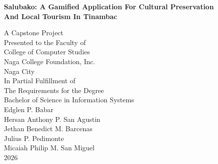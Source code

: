 \documentclass[11pt]{research}
\begin{document}
\thispagestyle{empty}
\begin{center}
  \vspace{0in}
  {\fontsize{14pt}{20pt}\selectfont \textbf{Salubako: A Gamified Application For Cultural Preservation \\ And Local Tourism In Tinambac} \par} 
  \vspace{1in}
  A Capstone Project\\
  Presented to the Faculty of\\
  College of Computer Studies\\
  Naga College Foundation, Inc.\\
  Naga City\\
  \vspace{1in}
  In Partial Fulfillment of\\
  The Requirements for the Degree\\
  Bachelor of Science in Information Systems\\
  \vspace{1in}
    Edglen P. Babar \\
    Hersan Anthony P. San Agustin \\
    Jethan Benedict M. Barcenas \\
    Julius P. Pedimonte \\
    Micaiah Philip M. San Miguel 
  \\
   \vfil
  2026
\end{center}





\end{document}
